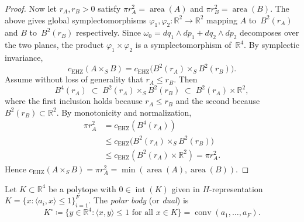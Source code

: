 \begin{unverified}
\begin{proof}
Now let $r_A, r_B > 0$ satisfy
$\pi r_A^2 = \operatorname{area}(A)$ and
$\pi r_B^2 = \operatorname{area}(B)$.
The above gives global symplectomorphisms
$\varphi_1, \varphi_2 \colon \mathbb{R}^2 \to \mathbb{R}^2$
mapping $A$ to~$B^2(r_A)$ and $B$ to~$B^2(r_B)$
respectively.
Since $\omega_0 = dq_1 \wedge dp_1 + dq_2 \wedge dp_2$
decomposes over the two planes, the product
$\varphi_1 \times \varphi_2$ is a symplectomorphism
of~$\mathbb{R}^4$.
By symplectic invariance,
\[
  c_{\mathrm{EHZ}}(A \times_S B)
    = c_{\mathrm{EHZ}}\bigl(B^2(r_A) \times_S B^2(r_B)\bigr).
\]
Assume without loss of generality that $r_A \leq r_B$.
Then
\[
  B^4(r_A)
    \;\subset\; B^2(r_A) \times_S B^2(r_B)
    \;\subset\; B^2(r_A) \times \mathbb{R}^2,
\]
where the first inclusion holds because $r_A \leq r_B$
and the second because $B^2(r_B) \subset \mathbb{R}^2$.
By monotonicity and normalization,
\begin{align*}
  \pi r_A^2
    &= c_{\mathrm{EHZ}}(B^4(r_A)) \\
    &\leq c_{\mathrm{EHZ}}\bigl(B^2(r_A) \times_S B^2(r_B)\bigr) \\
    &\leq c_{\mathrm{EHZ}}(B^2(r_A) \times \mathbb{R}^2)
    = \pi r_A^2.
\end{align*}
Hence $c_{\mathrm{EHZ}}(A \times_S B)
  = \pi r_A^2
  = \min(\operatorname{area}(A), \operatorname{area}(B))$.
\end{proof}
\end{unverified}



\begin{unverified}
\begin{definition}\label{def:polytope-dual}
Let $K \subset \mathbb{R}^4$ be a polytope with $0 \in \operatorname{int}(K)$
given in $H$-representation $K = \{x : \langle a_i, x\rangle \leq 1\}_{i=1}^F$.
The \emph{polar body} (or \emph{dual}) is
\[
  K^\circ \coloneqq \{y \in \mathbb{R}^4 : \langle x, y \rangle \leq 1
    \text{ for all } x \in K\}
  = \operatorname{conv}(a_1, \ldots, a_F).
\]
\end{definition}
\end{unverified}

\label{def:polar-body}%


